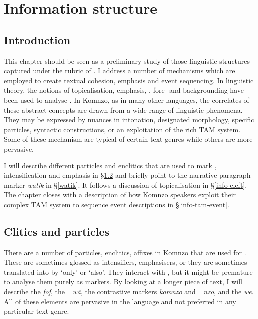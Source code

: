 
\chapter{Information structure} \label{cha:infostructure}

\section{Introduction} \label{intro-information-structure}

This chapter should be seen as a preliminary study of those linguistic structures captured under the rubric of . I address a number of mechanisms which are employed to create textual cohesion, emphasis and event sequencing. In linguistic theory, the notions of topicalisation, emphasis, , fore- and backgrounding have been used to analyse . In Komnzo, as in many other languages, the correlates of these abstract concepts are drawn from a wide range of linguistic phenomena. They may be expressed by nuances in intonation, designated morphology, specific particles, syntactic constructions, or an exploitation of the rich TAM system. Some of these mechanism are typical of certain text genres while others are more pervasive.%

I will describe different particles and enclitics that are used to mark , intensification and emphasis in \S{}\ref{info-foc-emph} and briefly point to the narrative paragraph marker \emph{watik} in \S{}\ref{watik}. It follows a discussion of topicalisation in \S{}\ref{info-cleft}. The chapter closes with a description of how Komnzo speakers exploit their complex TAM system to sequence event descriptions in \S{}\ref{info-tam-event}.

\section{Clitics and particles} \label{info-foc-emph}

There are a number of particles, enclitics, affixes in Komnzo that are used for . These are sometimes glossed as intensifiers, emphasisers, or they are sometimes translated into  by `only' or `also'. They interact with , but it might be premature to analyse them purely as  markers. By looking at a longer piece of text, I will describe the  \emph{fof}, the   \emph{=wä}, the contrastive markers \emph{komnzo} and \emph{=nzo}, and the  \emph{we}. All of these elements are pervasive in the language and not preferred in any particular text genre.%

